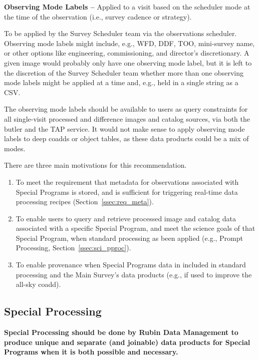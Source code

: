 \textbf{Observing Mode Labels -- } 
Applied to a visit based on the scheduler mode at the time of the observation
(i.e., survey cadence or strategy).

To be applied by the Survey Scheduler team via the observations scheduler.
Observing mode labels might include, e.g., WFD, DDF, TOO, mini-survey name, or other 
options like engineering, commissioning, and director's discretionary.
A given image would probably only have one observing mode label, but
it is left to the discretion of the Survey Scheduler team whether more than one
observing mode labels might be applied at a time and, e.g., held in a single string as a CSV.

The observing mode labels should be available to users as query constraints for
all single-visit processed and difference images and catalog sources,
via both the butler and the TAP service.
It would not make sense to apply observing mode labels to deep coadds or 
object tables, as these data products could be a mix of modes.


There are three main motivations for this recommendation.

\begin{enumerate}

\item To meet the requirement that metadata for observations associated 
with Special Programs is stored, and is sufficient for triggering 
real-time data processing recipes (Section~\ref{ssec:req_meta}).

\item To enable users to query and retrieve processed image and catalog
data associated with a specific Special Program, and meet the science goals
of that Special Program, when standard processing as been applied 
(e.g., Prompt Processing, Section~\ref{ssec:sci_pproc}).

\item To enable provenance when Special Programs data in included in standard
processing and the Main Survey's data products (e.g., if used to improve the
all-sky coadd).

\end{enumerate}

\subsection{Special Processing}\label{ssec:sci_sproc}

\textbf{Special Processing should be done by Rubin Data Management to 
produce unique and separate (and joinable) data products
for Special Programs when it is both possible and necessary.}

